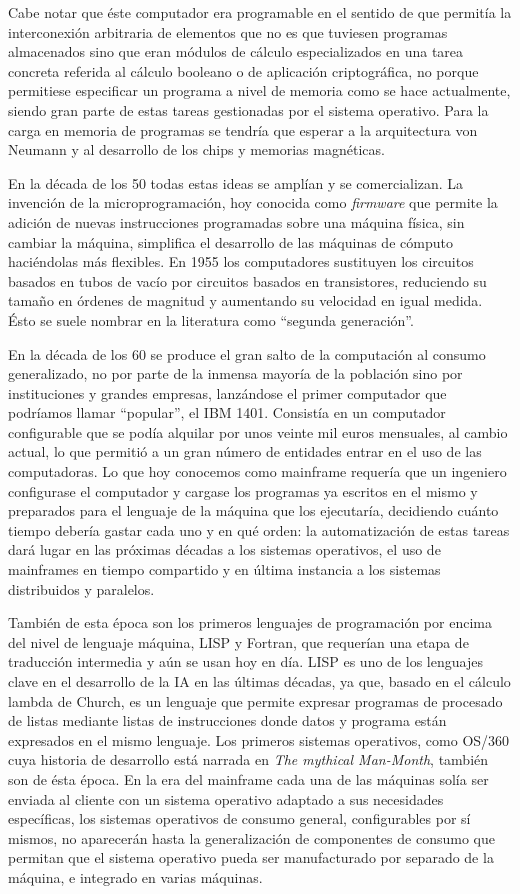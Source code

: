 \documentclass[12pt]{memoir}
\begin{document}
\begin{appendices}
Cabe notar que éste computador era programable en el sentido de que permitía la interconexión arbitraria de elementos que no es que tuviesen programas almacenados sino que eran módulos de cálculo especializados en una tarea concreta referida al cálculo booleano o de aplicación criptográfica, no porque permitiese especificar un programa a nivel de memoria como se hace actualmente, siendo gran parte de estas tareas gestionadas por el sistema operativo. Para la carga en memoria de programas se tendría que esperar a la arquitectura von Neumann y al desarrollo de los chips y memorias magnéticas.

En la década de los 50 todas estas ideas se amplían y se comercializan. La invención de la microprogramación, hoy conocida como \textit{firmware} que permite la adición de nuevas instrucciones programadas sobre una máquina física, sin cambiar la máquina, simplifica el desarrollo de las máquinas de cómputo haciéndolas más flexibles. En 1955 los computadores sustituyen los circuitos basados en tubos de vacío por circuitos basados en transistores, reduciendo su tamaño en órdenes de magnitud y aumentando su velocidad en igual medida. Ésto se suele nombrar en la literatura como ``segunda generación''.

En la década de los 60 se produce el gran salto de la computación al consumo generalizado, no por parte de la inmensa mayoría de la población sino por instituciones y grandes empresas, lanzándose el primer computador que podríamos llamar ``popular'', el IBM 1401. Consistía en un computador configurable que se podía alquilar por unos veinte mil euros mensuales, al cambio actual, lo que permitió a un gran número de entidades entrar en el uso de las computadoras. Lo que hoy conocemos como mainframe requería que un ingeniero configurase el computador y cargase los programas ya escritos en el mismo y preparados para el lenguaje de la máquina que los ejecutaría, decidiendo cuánto tiempo debería gastar cada uno y en qué orden: la automatización de estas tareas dará lugar en las próximas décadas a los sistemas operativos, el uso de mainframes en tiempo compartido y en última instancia a los sistemas distribuidos y paralelos. 

También de esta época son los primeros lenguajes de programación por encima del nivel de lenguaje máquina, LISP y Fortran, que requerían una etapa de traducción intermedia y aún se usan hoy en día. LISP es uno de los lenguajes clave en el desarrollo de la IA en las últimas décadas, ya que, basado en el cálculo lambda de Church, es un lenguaje que permite expresar programas de procesado de listas mediante listas de instrucciones donde datos y programa están expresados en el mismo lenguaje. Los primeros sistemas operativos, como OS/360 cuya historia de desarrollo está narrada en \textit{The mythical Man-Month}, también son de ésta época. En la era del mainframe cada una de las máquinas solía ser enviada al cliente con un sistema operativo adaptado a sus necesidades específicas, los sistemas operativos de consumo general, configurables por sí mismos, no aparecerán hasta la generalización de componentes de consumo que permitan que el sistema operativo pueda ser manufacturado por separado de la máquina, e integrado en varias máquinas.


\end{appendices}
\end{document}
